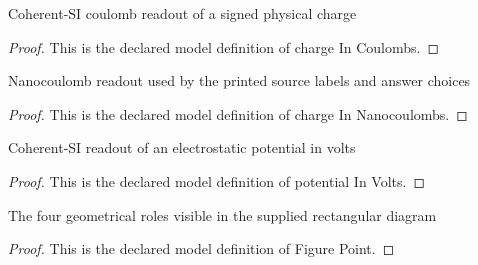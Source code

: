 \begin{definition}
  \label{def:physics:phyx-mini-0860:phyxminiproblems-problemphyxmini0860-chargeincoulombs}
  Coherent-SI coulomb readout of a signed physical charge
\end{definition}
\begin{proof}
  This is the declared model definition of charge In Coulombs.
\end{proof}
\begin{definition}
  \label{def:physics:phyx-mini-0860:phyxminiproblems-problemphyxmini0860-chargeinnanocoulombs}
  Nanocoulomb readout used by the printed source labels and answer choices
\end{definition}
\begin{proof}
  This is the declared model definition of charge In Nanocoulombs.
\end{proof}
\begin{definition}
  \label{def:physics:phyx-mini-0860:phyxminiproblems-problemphyxmini0860-potentialinvolts}
  Coherent-SI readout of an electrostatic potential in volts
\end{definition}
\begin{proof}
  This is the declared model definition of potential In Volts.
\end{proof}
\begin{definition}
  \label{def:physics:phyx-mini-0860:phyxminiproblems-problemphyxmini0860-figurepoint}
  The four geometrical roles visible in the supplied rectangular diagram
\end{definition}
\begin{proof}
  This is the declared model definition of Figure Point.
\end{proof}
